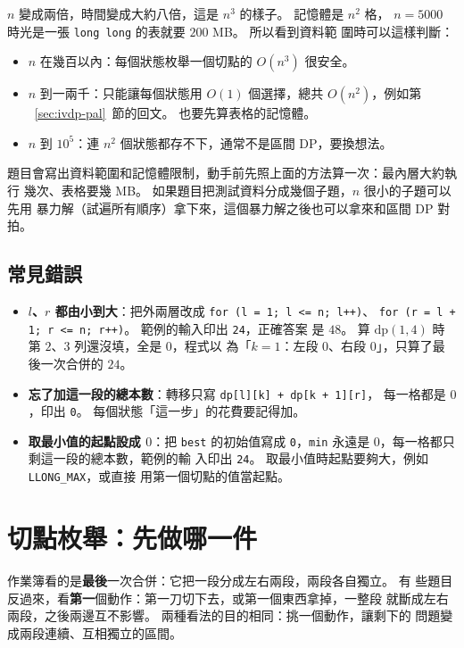 $n$ 變成兩倍，時間變成大約八倍，這是 $n^3$ 的樣子。 記憶體是 $n^2$ 格，
$n = 5000$ 時光是一張 \texttt{long long} 的表就要 $200$ MB。 所以看到資料範
圍時可以這樣判斷：

\begin{itemize}
\item $n$ 在幾百以內：每個狀態枚舉一個切點的 $O(n^3)$ 很安全。
\item $n$ 到一兩千：只能讓每個狀態用 $O(1)$ 個選擇，總共 $O(n^2)$，例如第
~\ref{sec:ivdp-pal}~節的回文。 也要先算表格的記憶體。
\item $n$ 到 $10^5$：連 $n^2$ 個狀態都存不下，通常不是區間 DP，要換想法。
\end{itemize}

\begin{apcsnote}
題目會寫出資料範圍和記憶體限制，動手前先照上面的方法算一次：最內層大約執行
幾次、表格要幾 MB。 如果題目把測試資料分成幾個子題，$n$ 很小的子題可以先用
暴力解（試遍所有順序）拿下來，這個暴力解之後也可以拿來和區間 DP 對拍。
\end{apcsnote}

\subsection{常見錯誤}

\begin{itemize}
\item \textbf{$l$、$r$ 都由小到大}：把外兩層改成 \texttt{for (l = 1; l <= n; l++)}、
\texttt{for (r = l + 1; r <= n; r++)}。 範例的輸入印出 \texttt{24}，正確答案
是 $48$。 算 $\mathrm{dp}(1, 4)$ 時第 $2$、$3$ 列還沒填，全是 $0$，程式以
為「$k = 1$：左段 $0$、右段 $0$」，只算了最後一次合併的 $24$。
\item \textbf{忘了加這一段的總本數}：轉移只寫 \texttt{dp[l][k] + dp[k + 1][r]}，
每一格都是 $0$，印出 \texttt{0}。 每個狀態「這一步」的花費要記得加。
\item \textbf{取最小值的起點設成 $0$}：把 \texttt{best} 的初始值寫成
\texttt{0}，\texttt{min} 永遠是 $0$，每一格都只剩這一段的總本數，範例的輸
入印出 \texttt{24}。 取最小值時起點要夠大，例如 \texttt{LLONG\_MAX}，或直接
用第一個切點的值當起點。
\end{itemize}

\section{切點枚舉：先做哪一件}
\label{sec:ivdp-split}

作業簿看的是\textbf{最後}一次合併：它把一段分成左右兩段，兩段各自獨立。 有
些題目反過來，看\textbf{第一}個動作：第一刀切下去，或第一個東西拿掉，一整段
就斷成左右兩段，之後兩邊互不影響。 兩種看法的目的相同：挑一個動作，讓剩下的
問題變成兩段連續、互相獨立的區間。

